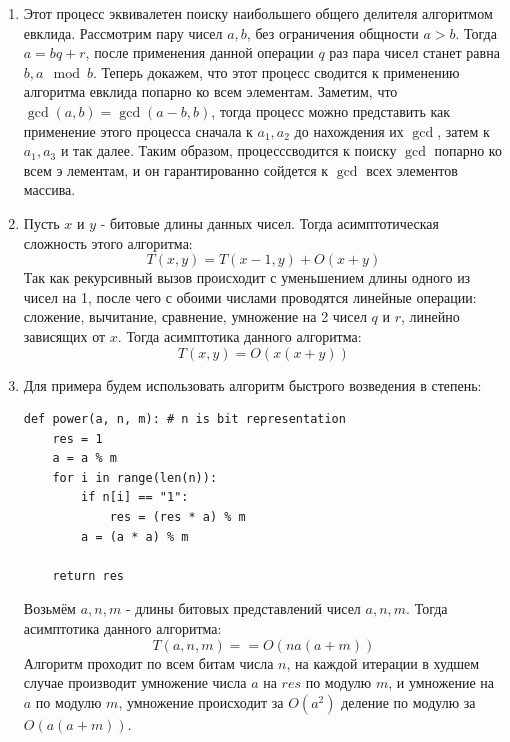 \documentclass{article}
\begin{document}
\begin{enumerate}
          Подставим $p = 3$:
          \[
              T(n) = O(\sum_{i=1}^{\lceil \log_{\frac{3}{2}}{n} \rceil} n1^i) = O(n \log n)
          \]

          Подставим $p = 7$:
          \[
              T(n) = O(\sum_{i=1}^{\lceil \log_{\frac{7}{5}}{n} \rceil} n(\frac{6}{7})^i) = O(n)
          \]

    \item Этот процесс эквивалетен поиску наибольшего
          общего делителя алгоритмом евклида. Рассмотрим
          пару чисел $a, b$, без ограничения общности
          $a > b$. Тогда $a = bq + r$, после применения
          данной операции $q$ раз пара чисел станет равна
          $b, a \mod b$. Теперь докажем, что этот процесс
          сводится к применению алгоритма евклида попарно
          ко всем элементам. Заметим, что
          $\gcd(a, b) = \gcd(a - b, b)$, тогда процесс
          можно представить как применение этого процесса
          сначала к $a_1, a_2$ до нахождения их $\gcd$,
          затем к $a_1, a_3$ и так далее. Таким образом,
          процесссводится к поиску $\gcd$ попарно ко всем э
          лементам, и он гарантированно сойдется
          к $\gcd$ всех элементов массива.

    \item Пусть $x$ и $y$ - битовые длины данных чисел.
          Тогда асимптотическая сложность этого алгоритма:
          \[
              T(x, y) = T(x - 1, y) + O(x + y)
          \]
          Так как рекурсивный вызов происходит с уменьшением
          длины одного из чисел на 1, после чего с обоими
          числами проводятся линейные операции: сложение,
          вычитание, сравнение, умножение на 2 чисел
          $q$ и $r$, линейно зависящих от $x$. Тогда
          асимптотика данного алгоритма:
          \[
              T(x, y) = O(x(x + y))
          \]

    \item Для примера будем использовать алгоритм
          быстрого возведения в степень:
          \begin{lstlisting}
def power(a, n, m): # n is bit representation
    res = 1
    a = a % m
    for i in range(len(n)):
        if n[i] == "1":
            res = (res * a) % m
        a = (a * a) % m

    return res
    \end{lstlisting}
          Возьмём $a, n, m$ - длины
          битовых представлений чисел $a, n, m$.
          Тогда асимптотика данного алгоритма:
          \[
              T(a, n, m) = = O(na(a + m))
          \]
          Алгоритм проходит по всем битам числа $n$,
          на каждой итерации в худшем случае производит
          умножение числа $a$ на $res$ по модулю $m$,
          и умножение на $a$ по модулю $m$, умножение
          происходит за $O(a^2)$ деление по модулю за
          $O(a(a + m))$.


\end{enumerate}
\end{document}
